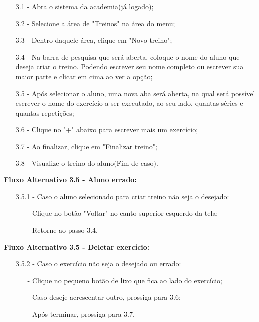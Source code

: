 \documentclass{article}
\begin{document}
    \begin{itemize}
        \item[3.1 -] Abra o sistema da academia(já logado);
        \item[3.2 -] Selecione a área de "Treinos" na área do menu;
        \item[3.3 -] Dentro daquele área, clique em "Novo treino";
        \item[3.4 -] Na barra de pesquisa que será aberta, coloque o nome do aluno que deseja criar o treino. Podendo escrever seu nome completo ou escrever sua maior parte e clicar em cima ao ver a opção;
        \item[3.5 -] Após selecionar o aluno, uma nova aba será aberta, na qual será possível escrever o nome do exercício a ser executado, ao seu lado, quantas séries e quantas repetições;
        \item[3.6 -] Clique no "+" abaixo para escrever mais um exercício;
        \item[3.7 -] Ao finalizar, clique em "Finalizar treino";
        \item[3.8 -] Visualize o treino do aluno(Fim de caso).
    \end{itemize}

    \textbf{Fluxo Alternativo 3.5 - Aluno errado:}

    \begin{itemize}
        \item[3.5.1 -] Caso o aluno selecionado para criar treino não seja o desejado:
        
         \begin{itemize}
             \item[-] Clique no botão "Voltar" no canto superior esquerdo da tela;
             \item[-] Retorne ao passo 3.4.
         \end{itemize}
    \end{itemize}

    \textbf{Fluxo Alternativo 3.5 - Deletar exercício:}

    \begin{itemize}
        \item[3.5.2 -] Caso o exercício não seja o desejado ou errado:
        
         \begin{itemize}
             \item[-] Clique no pequeno botão de lixo que fica ao lado do exercício;
             \item[-] Caso deseje acrescentar outro, prossiga para 3.6;
             \item[-] Após terminar, prossiga para 3.7.
         \end{itemize}
    \end{itemize}
\end{document}
